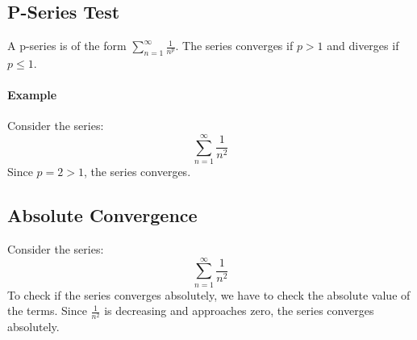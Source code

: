 \documentclass{article}
\begin{document}
\subsection*{P-Series Test}
A p-series is of the form \(\sum_{n=1}^\infty \frac{1}{n^p}\). The series converges if \(p > 1\) and diverges if \(p \leq 1\).

\paragraph{Example}
Consider the series:
\[
\sum_{n=1}^\infty \frac{1}{n^2}
\]
Since \(p = 2 > 1\), the series converges.

\subsection*{Absolute Convergence}
Consider the series:
\[
\sum_{n=1}^\infty \frac{1}{n^2}
\]
To check if the series converges absolutely, we have to check the absolute value of the terms. Since \(\frac{1}{n^2}\) is decreasing and approaches zero, the series converges absolutely.    
\end{document}
